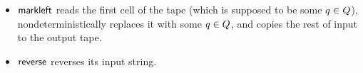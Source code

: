 {\begin{itemize}
	
%	
	\item
	$\mathsf{markleft}$ reads the first cell of the tape (which is supposed to be some $q\in Q$), nondeterministically replaces it with some $q\in Q$, and copies the rest of input to the output tape. 
%	
%	
	\item
	$\mathsf{reverse}$ reverses its input string.
	

\end{itemize}}
